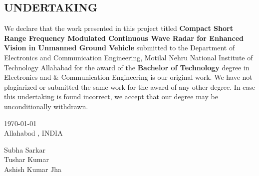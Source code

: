 \begin{center}
\section*{UNDERTAKING}
\end{center}
\begin{Large}
\begin{onehalfspace}
We declare that the work presented in this project titled \textbf{Compact Short Range Frequency Modulated Continuous Wave Radar for Enhanced Vision in Unmanned Ground Vehicle} submitted to the Department of Electronics and Communication Engineering, Motilal Nehru National Institute of Technology Allahabad for the award of the \textbf{Bachelor of Technology} degree in Electronics and \& Communication Engineering is our original work. We have not plagiarized or submitted the same work for the award of any other degree. In case this undertaking is found incorrect, we accept that our degree may be unconditionally withdrawn.
\end{onehalfspace}
\end{Large}

\begin{Large}
\begin{onehalfspace}
\begin{flushleft}
\today \\
Allahabad , INDIA
\end{flushleft}
\end{onehalfspace}
\end{Large}

\begin{Large}
\begin{onehalfspace}
\begin{flushright}
Subha Sarkar \\[0.2in]
Tushar Kumar \\[0.2in]
Ashish Kumar Jha \\[0.1in]
\end{flushright}
\end{onehalfspace}
\end{Large}